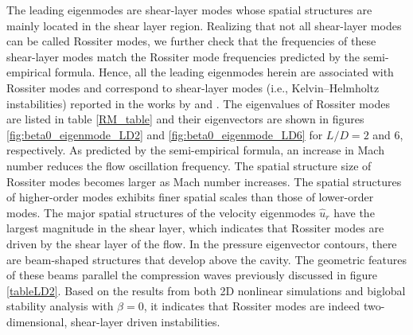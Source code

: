 \documentclass{jfm}
\begin{document}
The leading eigenmodes are shear-layer modes whose spatial structures are mainly located in the shear layer region. Realizing that not all shear-layer modes can be called Rossiter modes, we further check that the frequencies of these shear-layer modes match the Rossiter mode frequencies predicted by the semi-empirical formula. Hence, all the leading eigenmodes herein are associated with Rossiter modes and correspond to shear-layer modes (i.e., Kelvin--Helmholtz instabilities) reported in the works by \cite{Garrido:JFM14} and \cite{Yamouni:JFM13}. The eigenvalues of Rossiter modes are listed in table \ref{RM_table} and their eigenvectors are shown in figures \ref{fig:beta0_eigenmode_LD2} and \ref{fig:beta0_eigenmode_LD6} for $L/D=2$ and 6, respectively. As predicted by the semi-empirical formula, an increase in Mach number reduces the flow oscillation frequency. The spatial structure size of Rossiter modes becomes larger as Mach number increases. The spatial structures of higher-order modes exhibits finer spatial scales than those of lower-order modes. The major spatial structures of the velocity eigenmodes $\hat u_r$ have the largest magnitude in the shear layer, which indicates that Rossiter modes are driven by the shear layer of the flow. In the pressure eigenvector contours, there are beam-shaped structures that develop above the cavity. The geometric features of these beams parallel the compression waves previously discussed in figure \ref{tableLD2}. Based on the results from both 2D nonlinear simulations and biglobal stability analysis with $\beta=0$, it indicates that Rossiter modes are indeed two-dimensional, shear-layer driven instabilities. 
\end{document}
